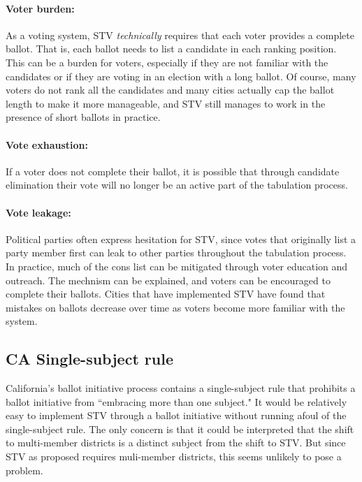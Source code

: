 \documentclass{amsart}
\theoremstyle{definition}
\begin{document}
    \paragraph{\bf{Voter burden:}} As a voting system, STV \emph{technically} requires that each voter provides 
                    a complete ballot. That is, each ballot needs to list a candidate in each ranking position.
                    This can be a burden for voters, especially if they are not familiar with the candidates
                    or if they are voting in an election with a long ballot.
                    Of course, many voters do not rank all the candidates and many cities
                    actually cap the ballot length to make it more manageable, and STV 
                    still manages to work in the presence of short ballots in practice. \\

    \paragraph{\bf{Vote exhaustion:}} If a voter does not complete their ballot, it is possible that 
                    through candidate elimination their vote will no longer be an active 
                    part of the tabulation process. \\

    \paragraph{\bf{Vote leakage:}} Political parties often express hesitation for STV,
    since votes that originally list a party member first can leak to other parties throughout 
    the tabulation process.\\

In practice, much of the cons list can be mitigated through voter education and outreach. 
The mechnism can be explained, and voters can be encouraged to complete their ballots.
Cities that have implemented STV have found that mistakes on ballots decrease over time
as voters become more familiar with the system. 




\subsection{CA Single-subject rule}
California's ballot initiative process contains a single-subject rule that prohibits
a ballot initiative from ``embracing more than one subject." 
It would be relatively easy to implement STV through a ballot initiative without running
afoul of the single-subject rule.
The only concern is that it could be interpreted that the shift to multi-member districts 
is a distinct subject from the shift to STV.
But since STV as proposed requires muli-member districts, this seems unlikely to pose a problem.
\end{document}
